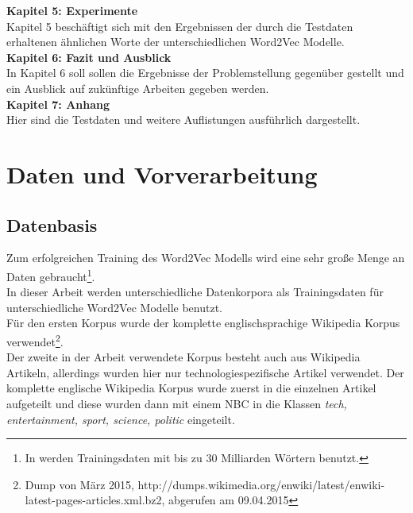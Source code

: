 \documentclass[12pt,a4paper]{report}
\begin{document}
	\textbf{Kapitel 5: Experimente}\\
	Kapitel 5 beschäftigt sich mit den Ergebnissen der durch die Testdaten erhaltenen ähnlichen Worte der unterschiedlichen Word2Vec Modelle.\\
	
	\textbf{Kapitel 6: Fazit und Ausblick}\\
	In Kapitel 6 soll sollen die Ergebnisse der Problemstellung gegenüber gestellt und ein Ausblick auf zukünftige Arbeiten gegeben werden.\\
	
	\textbf{Kapitel 7: Anhang}\\
	Hier sind die Testdaten und weitere Auflistungen ausführlich dargestellt.\\

\newpage
\chapter{Daten und Vorverarbeitung}
	\section{Datenbasis}
	Zum erfolgreichen Training des Word2Vec Modells wird eine sehr große Menge an Daten gebraucht\footnote{In \cite{DBLP:journals/corr/MikolovSCCD13} werden Trainingsdaten mit bis zu 30 Milliarden Wörtern benutzt.}. \\
	In dieser Arbeit werden unterschiedliche Datenkorpora als Trainingsdaten für unterschiedliche Word2Vec Modelle benutzt.\\	
	Für den ersten Korpus wurde der komplette englischsprachige Wikipedia Korpus verwendet\footnote{Dump von März 2015, http://dumps.wikimedia.org/enwiki/latest/enwiki-latest-pages-articles.xml.bz2, abgerufen am 09.04.2015}.\\
	Der zweite in der Arbeit verwendete Korpus besteht auch aus Wikipedia Artikeln, allerdings wurden hier nur technologiespezifische Artikel verwendet. Der komplette englische Wikipedia Korpus wurde zuerst in die einzelnen Artikel aufgeteilt und diese wurden dann mit einem NBC in die Klassen \textit{tech, entertainment, sport, science, politic} eingeteilt.\\
	
\end{document}
